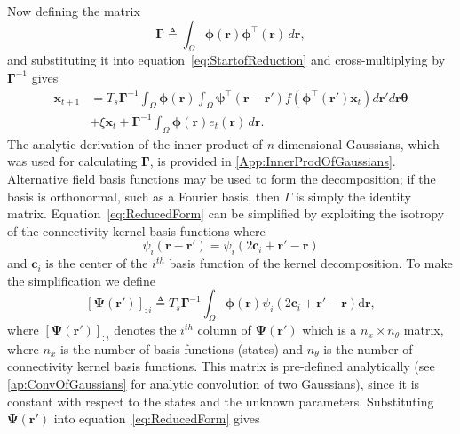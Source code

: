 \documentclass[review,authoryear,3p]{elsarticle}
\begin{document}
Now defining the matrix
\begin{equation}\label{eq:DefGamma}
	\boldsymbol{\Gamma} \triangleq \int_\Omega {\boldsymbol{\phi} \left(\mathbf{r}\right)\boldsymbol{\phi} ^{\top}\left(\mathbf{r}\right) \, d\mathbf{r}}, 
\end{equation}
and substituting it into equation~\ref{eq:StartofReduction} and cross-multiplying by $\boldsymbol{\Gamma}^{-1}$ gives
\begin{align}
    \label{eq:ReducedForm}
	 \mathbf{x}_{t+1} &= T_s\boldsymbol{\Gamma}^{-1}
	 \int_\Omega \boldsymbol{\phi}(\mathbf{r}) 
	 \int_\Omega \boldsymbol{\psi}^{\top} (\mathbf{r}-\mathbf{r}')f(\boldsymbol{\phi}^{\top}(\mathbf{r}')\mathbf{x}_t)d\mathbf{r}' d\mathbf{r} \boldsymbol{\theta}  \nonumber \\
	& + \xi\mathbf{x}_t + \boldsymbol{\Gamma}^{-1} \int_\Omega{\boldsymbol{\phi}(\mathbf{r}) e_t(\mathbf{r}) \, d\mathbf{r}}.
\end{align}
The analytic derivation of the inner product of \emph{n}-dimensional Gaussians, which was used for calculating $\mathbf\Gamma$, is provided in \ref{App:InnerProdOfGaussians}. Alternative field basis functions may be used to form the decomposition; if the basis is orthonormal, such as a Fourier basis, then $\Gamma$ is simply the identity matrix. Equation~\ref{eq:ReducedForm} can be simplified by exploiting the isotropy of the connectivity kernel basis functions where
\begin{equation}
	\psi_i (\mathbf{r}-\mathbf{r}') = \psi_i (2\mathbf{c}_i+\mathbf{r}'-\mathbf{r})
\end{equation}
and $\mathbf{c}_i$ is the center of the $i^{th}$ basis function of the kernel decomposition. To make the simplification we define
\begin{equation}\label{eq:DefPsi}
	\left[ \boldsymbol\Psi(\mathbf{r}')\right]_{:i}  \triangleq T_s\boldsymbol{\Gamma}^{-1}\int_\Omega {\boldsymbol{\phi}(\mathbf{r})\psi_i (2\mathbf{c}_i+\mathbf{r}'-\mathbf{r})\textrm{d}\mathbf{r}},
\end{equation}
where $\left[ \boldsymbol\Psi(\mathbf{r}')\right]_{:i}$ denotes the $i^{th}$ column of $\boldsymbol{\Psi}(\mathbf{r}')$ which is a $n_x \times n_{\theta}$ matrix, where $n_x$ is the number of basis functions (states) and $n_{\theta}$ is the number of connectivity kernel basis functions. This matrix is pre-defined analytically (see \ref{ap:ConvOfGaussians} for analytic convolution of two Gaussians), since it is constant with respect to the states and the unknown parameters. Substituting $\boldsymbol{\Psi}(\mathbf{r}')$ into equation~\ref{eq:ReducedForm} gives
\end{document}
